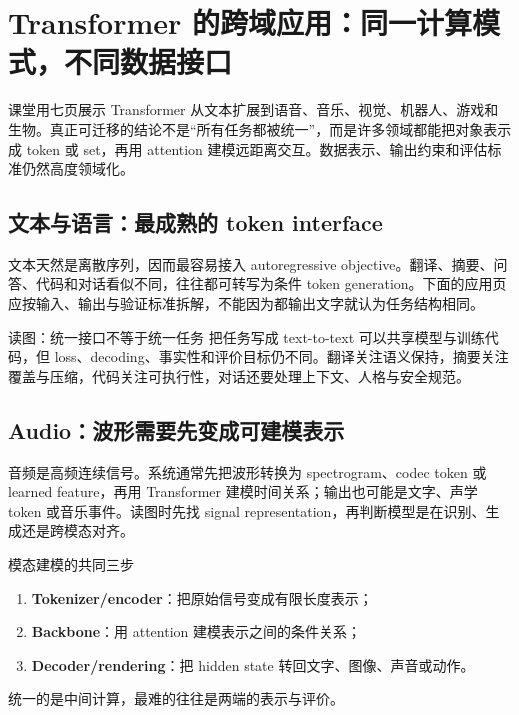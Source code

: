 \section{Transformer 的跨域应用：同一计算模式，不同数据接口}

课堂用七页展示 Transformer 从文本扩展到语音、音乐、视觉、机器人、游戏和生物。真正可迁移的结论不是“所有任务都被统一”，而是许多领域都能把对象表示成 token 或 set，再用 attention 建模远距离交互。数据表示、输出约束和评估标准仍然高度领域化。

\subsection{文本与语言：最成熟的 token interface}

文本天然是离散序列，因而最容易接入 autoregressive objective。翻译、摘要、问答、代码和对话看似不同，往往都可转写为条件 token generation。下面的应用页应按输入、输出与验证标准拆解，不能因为都输出文字就认为任务结构相同。


\begin{knowledgebox}{读图：统一接口不等于统一任务}
把任务写成 text-to-text 可以共享模型与训练代码，但 loss、decoding、事实性和评价目标仍不同。翻译关注语义保持，摘要关注覆盖与压缩，代码关注可执行性，对话还要处理上下文、人格与安全规范。
\end{knowledgebox}

\subsection{Audio：波形需要先变成可建模表示}

音频是高频连续信号。系统通常先把波形转换为 spectrogram、codec token 或 learned feature，再用 Transformer 建模时间关系；输出也可能是文字、声学 token 或音乐事件。读图时先找 signal representation，再判断模型是在识别、生成还是跨模态对齐。



\begin{importantbox}{模态建模的共同三步}
\begin{enumerate}
  \item \textbf{Tokenizer/encoder}：把原始信号变成有限长度表示；
  \item \textbf{Backbone}：用 attention 建模表示之间的条件关系；
  \item \textbf{Decoder/rendering}：把 hidden state 转回文字、图像、声音或动作。
\end{enumerate}
统一的是中间计算，最难的往往是两端的表示与评价。
\end{importantbox}


